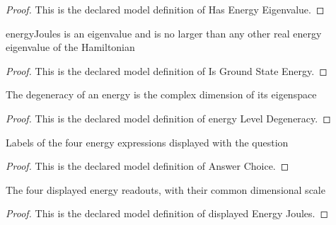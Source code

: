 \begin{proof}
  This is the declared model definition of Has Energy Eigenvalue.
\end{proof}
\begin{definition}
  \label{def:physics:phyx-mini-0606:phyxminiproblems-problemphyxmini0606-isgroundstateenergy}
  energyJoules is an eigenvalue and is no larger than any other real energy eigenvalue of the Hamiltonian
\end{definition}
\begin{proof}
  This is the declared model definition of Is Ground State Energy.
\end{proof}
\begin{definition}
  \label{def:physics:phyx-mini-0606:phyxminiproblems-problemphyxmini0606-energyleveldegeneracy}
  The degeneracy of an energy is the complex dimension of its eigenspace
\end{definition}
\begin{proof}
  This is the declared model definition of energy Level Degeneracy.
\end{proof}
\begin{definition}
  \label{def:physics:phyx-mini-0606:phyxminiproblems-problemphyxmini0606-answerchoice}
  Labels of the four energy expressions displayed with the question
\end{definition}
\begin{proof}
  This is the declared model definition of Answer Choice.
\end{proof}
\begin{definition}
  \label{def:physics:phyx-mini-0606:phyxminiproblems-problemphyxmini0606-displayedenergyjoules}
  The four displayed energy readouts, with their common dimensional scale
\end{definition}
\begin{proof}
  This is the declared model definition of displayed Energy Joules.
\end{proof}
